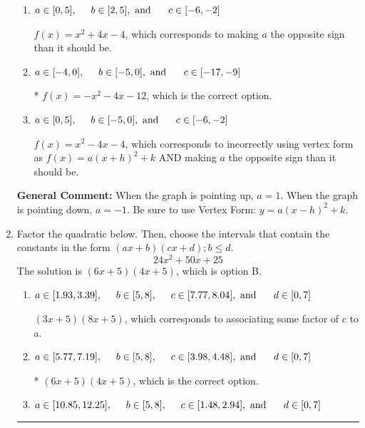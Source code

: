 \documentclass{extbook}[14pt]
\newcommand{\litem}[1]{\item #1

\rule{\textwidth}{0.4pt}}
\begin{document}
\begin{enumerate}
{\begin{enumerate}[label=\Alph*.]
$f(x)=-x^{2} +4 x -12$, which corresponds to incorrectly using vertex form as $f(x) = a(x+h)^2+k$.
\item \( a \in [0, 5], \hspace*{5mm} b \in [2, 5], \text{ and } \hspace*{5mm} c \in [-6, -2] \)

$f(x)=x^{2} +4 x -4$, which corresponds to making $a$ the opposite sign than it should be.
\item \( a \in [-4, 0], \hspace*{5mm} b \in [-5, 0], \text{ and } \hspace*{5mm} c \in [-17, -9] \)

* $f(x)=-x^{2} -4 x -12$, which is the correct option.
\item \( a \in [0, 5], \hspace*{5mm} b \in [-5, 0], \text{ and } \hspace*{5mm} c \in [-6, -2] \)

$f(x)=x^{2} -4 x -4$, which corresponds to incorrectly using vertex form as $f(x) = a(x+h)^2+k$ AND making $a$ the opposite sign than it should be.
\end{enumerate}

\textbf{General Comment:} When the graph is pointing up, $a=1$. When the graph is pointing down, $a=-1$. Be sure to use Vertex Form: $y = a(x-h)^2+k$.
}
\litem{
Factor the quadratic below. Then, choose the intervals that contain the constants in the form $(ax+b)(cx+d); b \leq d.$
\[ 24x^{2} +50 x + 25 \]The solution is \( (6x + 5)(4x + 5) \), which is option B.\begin{enumerate}[label=\Alph*.]
\item \( a \in [1.93, 3.39], \hspace*{5mm} b \in [5, 8], \hspace*{5mm} c \in [7.77, 8.04], \text{ and } \hspace*{5mm} d \in [0, 7] \)

 $(3x + 5)(8x + 5)$, which corresponds to associating some factor of c to a.
\item \( a \in [5.77, 7.19], \hspace*{5mm} b \in [5, 8], \hspace*{5mm} c \in [3.98, 4.48], \text{ and } \hspace*{5mm} d \in [0, 7] \)

* $(6x + 5)(4x + 5)$, which is the correct option.
\item \( a \in [10.85, 12.25], \hspace*{5mm} b \in [5, 8], \hspace*{5mm} c \in [1.48, 2.94], \text{ and } \hspace*{5mm} d \in [0, 7] \)


\end{enumerate}}
\end{enumerate}
\end{document}
